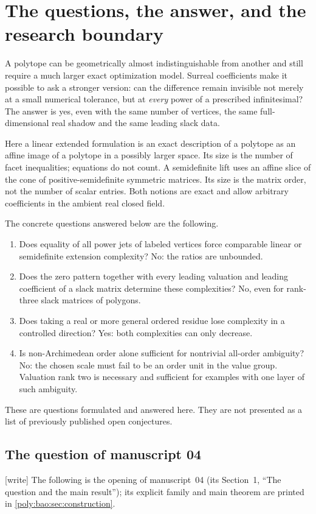 \documentclass[11pt,a4paper]{article}
\numberwithin{equation}{section}
\theoremstyle{plain}
\newcommand{\wtag}{\textup{[write]}}%
\begin{document}
\section{The questions, the answer, and the research boundary}\label{poly:ic:sec:scope}

A polytope can be geometrically almost indistinguishable from another and
still require a much larger exact optimization model. Surreal coefficients
make it possible to ask a stronger version: can the difference remain
invisible not merely at a small numerical tolerance, but at \emph{every}
power of a prescribed infinitesimal? The answer is yes, even with the same
number of vertices, the same full-dimensional real shadow and the same
leading slack data.

Here a linear extended formulation is an exact description of a polytope
as an affine image of a polytope in a possibly larger space. Its size is the
number of facet inequalities; equations do not count. A semidefinite lift
uses an affine slice of the cone of positive-semidefinite symmetric
matrices. Its size is the matrix order, not the number of scalar entries.
Both notions are exact and allow arbitrary coefficients in the ambient
real closed field.

The concrete questions answered below are the following.
\begin{enumerate}[label=\textbf{(\arabic*)},leftmargin=*,itemsep=3pt]
\item Does equality of all power jets of labeled vertices force comparable
linear or semidefinite extension complexity? No: the ratios are unbounded.
\item Does the zero pattern together with every leading valuation and
leading coefficient of a slack matrix determine these complexities? No,
even for rank-three slack matrices of polygons.
\item Does taking a real or more general ordered residue lose complexity
in a controlled direction? Yes: both complexities can only decrease.
\item Is non-Archimedean order alone sufficient for nontrivial all-order
ambiguity? No: the chosen scale must fail to be an order unit in the value
group. Valuation rank two is necessary and sufficient for examples with
one layer of such ambiguity.
\end{enumerate}
These are questions formulated and answered here. They are not presented
as a list of previously published open conjectures.

\subsection{The question of manuscript 04}\label{poly:bao:sec:intro}
\wtag{} The following is the opening of manuscript~04 (its Section~1, ``The
question and the main result''); its explicit family and main theorem are
printed in \cref{poly:bao:sec:construction}.
\end{document}
